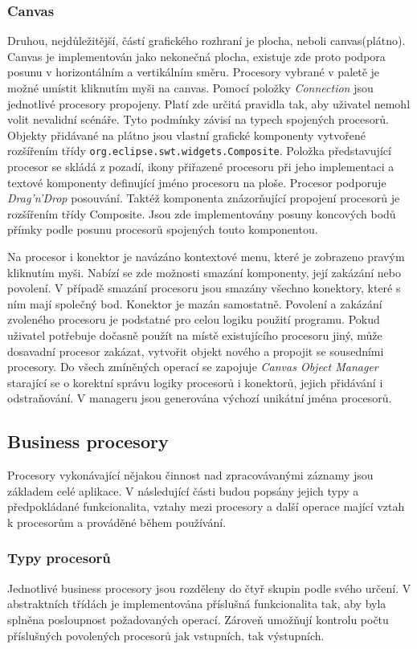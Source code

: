 \documentclass[ing,male,java,dept460]{diploma}		%
\begin{document}
\subsubsection{Canvas}
Druhou, nejdůležitější, částí grafického rozhraní je plocha, neboli canvas(plátno). Canvas je implementován jako nekonečná plocha, existuje zde proto podpora posunu v horizontálním a vertikálním směru. Procesory vybrané v paletě je možné umístit kliknutím myši na canvas. Pomocí položky \textit{Connection} jsou jednotlivé procesory propojeny. Platí zde určitá pravidla tak, aby uživatel nemohl volit nevalidní scénáře. Tyto podmínky závisí na typech spojených procesorů. Objekty přidávané na plátno jsou vlastní grafické komponenty vytvořené rozšířením třídy \texttt{org.eclipse.swt.widgets.Composite}. Položka představující procesor se skládá z pozadí, ikony přiřazené procesoru při jeho implementaci a textové komponenty definující jméno procesoru na ploše. Procesor podporuje \textit{Drag'n'Drop} posouvání. Taktéž komponenta znázorňující propojení procesorů je rozšířením třídy Composite. Jsou zde implementovány posuny koncových bodů přímky podle posunu procesorů spojených touto komponentou.
\par Na procesor i konektor je navázáno kontextové menu, které je zobrazeno pravým kliknutím myši. Nabízí se zde možnosti smazání komponenty, její zakázání nebo povolení. V případě smazání procesoru jsou smazány všechno konektory, které s ním mají společný bod. Konektor je mazán samostatně. Povolení a zakázání zvoleného procesoru je podstatné pro celou logiku použití programu. Pokud uživatel potřebuje dočasně použít na místě existujícího procesoru jiný, může dosavadní procesor zakázat, vytvořit objekt nového a propojit se sousedními procesory. Do všech zmíněných operací se zapojuje \textit{Canvas Object Manager} starající se o korektní správu logiky procesorů i konektorů, jejich přidávání i odstraňování. V manageru jsou generována výchozí unikátní jména procesorů.

\subsection{Business procesory}
Procesory vykonávající nějakou činnost nad zpracovávanými záznamy jsou základem celé aplikace. V následující části budou popsány jejich typy a předpokládané funkcionalita, vztahy mezi procesory a další operace mající vztah k procesorům a prováděné během používání.
\subsubsection{Typy procesorů}
Jednotlivé business procesory jsou rozděleny do čtyř skupin podle svého určení. V abstraktních třídách je implementována příslušná funkcionalita tak, aby byla splněna posloupnost požadovaných operací. Zároveň umožňují kontrolu počtu příslušných povolených procesorů jak vstupních, tak výstupních.
\end{document}
